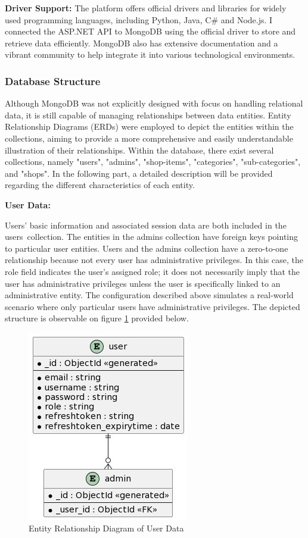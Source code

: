 \newpage

\textbf{Driver Support:} The platform offers official drivers and libraries for widely used programming languages, including Python, Java, C\# and Node.js. 
I connected the ASP.NET API to MongoDB using the official driver to store and retrieve data efficiently. MongoDB also has extensive documentation and a vibrant community to help integrate it into various technological environments. 


\subsubsection{Database Structure}

Although MongoDB was not explicitly designed with focus on handling relational data, it is still capable of managing relationships between data entities. Entity Relationship Diagrams (ERDs) were employed to depict the entities within the collections, aiming to provide a more comprehensive and easily understandable illustration of their relationships. 
Within the database, there exist several collections, namely "users", "admins", "shop-items", "categories", "sub-categories", and "shops". In the following part, a detailed description will be provided regarding the different characteristics of each entity.

\noindent\textbf{User Data:} 

Users' basic information and associated session data are both included in the users collection. The entities in the admins collection have foreign keys pointing to particular user entities. Users and the admins collection have a zero-to-one relationship because not every user has administrative privileges. In this case, the role field indicates the user's assigned role; it does not necessarily imply that the user has administrative privileges unless the user is specifically linked to an administrative entity. The configuration described above simulates a real-world scenario where only particular users have administrative privileges. The depicted structure is observable on figure \ref{fig:uerd} provided below.

\begin{figure}[H]
	\centering
	\includegraphics[width=0.4\linewidth]{img/Users_erd.png}
	\caption{Entity Relationship Diagram of User Data}
	\label{fig:uerd}
\end{figure}

